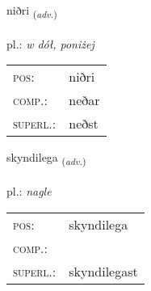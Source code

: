 \documentclass[frontgrid, backgrid]{flacards}\usepackage[]{graphicx}\usepackage[]{xcolor}
\begin{document}
\renewcommand{\blhead}{\vskip5pt {\small\bfseries\footnotesize Atviksorð | Adverb }}
\renewcommand{\bcfoot}{\vskip5pt \hspace{2pt}{\small\bfseries\footnotesize 2K}}


{niðri \small{\textsubscript{(\textit{adv.})}} \\[1ex] %
\textphonetic{[nɪðrɪ]} \\
pl.: \emph{w dół, poniżej} \\  [2ex]
\renewcommand*{\arraystretch}{0.8}
\begin{tabular}{ll}
\textsc{pos}: & niðri \\ 
\textsc{comp.}: & neðar \\ 
\textsc{superl.}: & neðst \\
\end{tabular}
}

\renewcommand{\flhead}{\vskip5pt \fboxsep=0pt {\small\bfseries\footnotesize Atviksorð | Adverb}}
\renewcommand{\fcfoot}{\vskip5pt \fboxsep=0pt \hspace{2pt}{\small\bfseries\footnotesize 2K}}

\renewcommand{\blhead}{\vskip5pt {\small\bfseries\footnotesize Atviksorð | Adverb }}
\renewcommand{\bcfoot}{\vskip5pt \hspace{2pt}{\small\bfseries\footnotesize 2K}}


{skyndilega \small{\textsubscript{(\textit{adv.})}} \\[1ex] %
\textphonetic{[scɪntɪlɛɣa]} \\
pl.: \emph{nagle} \\  [2ex]
\renewcommand*{\arraystretch}{0.8}
\begin{tabular}{ll}
\textsc{pos}: & skyndilega \\ 
\textsc{comp.}: &  \\ 
\textsc{superl.}: & skyndilegast \\
\end{tabular}
}

\renewcommand{\flhead}{\vskip5pt \fboxsep=0pt {\small\bfseries\footnotesize Nafnorð | Noun}}
\renewcommand{\fcfoot}{\vskip5pt \fboxsep=0pt \hspace{2pt}{\small\bfseries\footnotesize 2K}}
\end{document}
